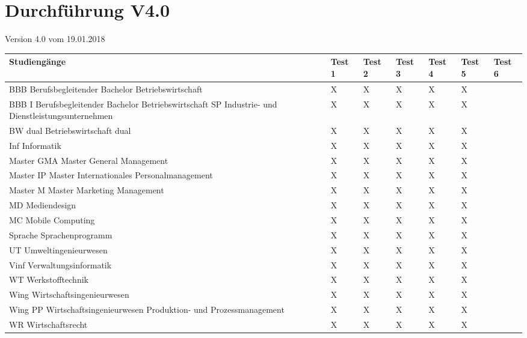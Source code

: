 \section{Durchführung V4.0}
Version 4.0 vom 19.01.2018\newline
\noindent%
\begin{tabularx}{\textwidth}{|p{}|X|X|X|X|X|X| }
\hline
\textbf{Studiengänge} &\textbf{Test 1} &\textbf{Test 2} &\textbf{Test 3}&\textbf{Test 4} &\textbf{Test 5} &\textbf{Test 6}  \\ \hline 

BBB  Berufsbegleitender Bachelor Betriebswirtschaft & X & X & X & X & X &   \\ \hline
BBB I  Berufsbegleitender Bachelor Betriebswirtschaft SP Industrie- und Dienstleistungsunternehmen & X & X & X & X & X &   \\ \hline
BW dual  Betriebswirtschaft dual & X & X & X & X & X &  \\ \hline
Inf  Informatik & X & X & X & X & X &   \\ \hline
Master GMA  Master General Management & X & X & X & X & X &   \\ \hline
Master IP  Master Internationales Personalmanagement & X & X & X & X & X &  \\ \hline
Master M  Master Marketing Management & X & X & X & X & X &   \\ \hline
MD  Mediendesign & X & X & X & X & X &   \\ \hline
MC  Mobile Computing & X & X & X & X & X &  \\ \hline
Sprache  Sprachenprogramm & X & X & X & X & X &  \\ \hline
UT  Umweltingenieurwesen & X & X & X & X & X &   \\ \hline
Vinf  Verwaltungsinformatik & X & X & X & X & X &  \\ \hline
WT  Werkstofftechnik & X & X & X & X & X &  \\ \hline
Wing  Wirtschaftsingenieurwesen & X & X & X & X & X &  \\ \hline
Wing PP Wirtschaftsingenieurwesen Produktion- und Prozessmanagement & X & X & X & X & X &   \\ \hline
WR  Wirtschaftsrecht & X & X & X & X & X &  \\ \hline
\end{tabularx}
 \newline
\newline

